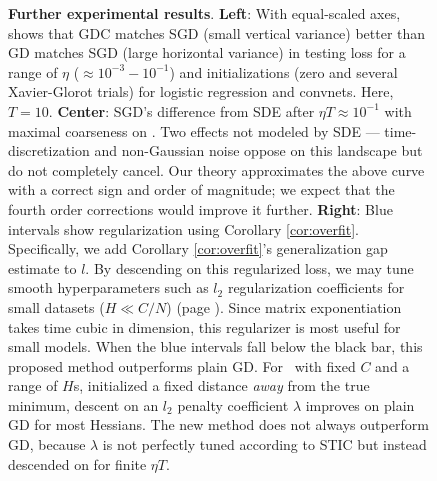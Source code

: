         \begin{figure}[h] 
            \centering
            \centering
            \caption{
                \textbf{Further experimental results}.
                \textbf{Left}:
                With equal-scaled axes, \protect{} shows that GDC
                    matches SGD (small vertical variance) better than GD
                    matches SGD (large horizontal variance) in testing loss for
                    a range of $\eta$ ($\approx 10^{-3}-10^{-1}$) and initializations
                    (zero and several Xavier-Glorot trials) for logistic
                    regression and convnets.  Here, $T=10$. 
                \textbf{Center}: SGD's difference from SDE after $\eta T
                \approx 10^{-1}$ with maximal coarseness on \Gauss.  Two
                effects not modeled by SDE --- time-discretization and
                non-Gaussian noise oppose on this landscape but do not
                completely cancel.  Our theory approximates the above curve
                with a correct sign and order of magnitude; we expect that the
                fourth order corrections would improve it further.
                \textbf{Right}: Blue intervals show regularization using Corollary
                \ref{cor:overfit}.  Specifically, 
                we add Corollary \ref{cor:overfit}'s
                generalization gap estimate to $l$.  By descending on this
                regularized loss, we may tune smooth hyperparameters such as $l_2$
                regularization coefficients for small datasets ($H \ll C/N$)
                (page \pageref{appendix:figures}).  Since matrix exponentiation takes time
                cubic in dimension, this regularizer is most useful for small
                models.
                When the blue intervals fall below the
                black bar, this proposed method outperforms plain GD.  For
                \MeanEstimation\ with fixed $C$ and a range of $H$s, initialized
                a fixed distance \emph{away} from the true minimum, descent on
                an $l_2$ penalty coefficient $\lambda$ improves on plain GD for
                most Hessians.  The new method does not always outperform GD,
                because $\lambda$ is not perfectly tuned according to STIC but
                instead descended on for finite $\eta T$.
            }
            \label{fig:takreg}
        \end{figure}


